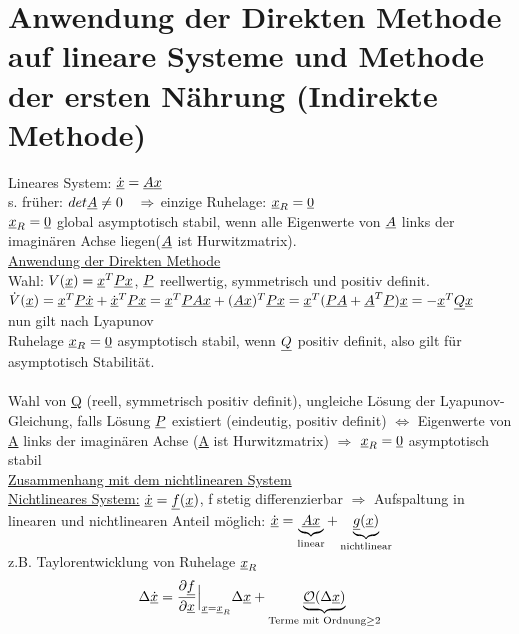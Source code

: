 \documentclass[openany,a4paper,11pt]{book}
\begin{document}
\section[Indirekte Methode]{Anwendung der Direkten Methode auf lineare Systeme und Methode der ersten Nährung (Indirekte Methode)}
Lineares System: $\dot{\uline{x}}=\uline{A}\uline{x}$\\
s. früher: $det\uline{A}\ne 0 \quad \Rightarrow$ einzige Ruhelage: $\uline{x}_R=\uline{0}$\\
$\uline{x}_R=\uline{0}$ global asymptotisch stabil, wenn alle Eigenwerte von $\uline{A}$ links der imaginären Achse liegen($\uline{A}$ ist Hurwitzmatrix).\\
\uline{Anwendung der Direkten Methode}\\
Wahl: $V(\uline{x})=\uline{x}^T\uline{P}\uline{x}$, $\uline{P}$ reellwertig, symmetrisch und positiv definit.\\
$\dot{V}(\uline{x})=\uline{x}^T\uline{P}\uline{\dot{x}}+\dot{\uline{x}}^T\uline{P}\uline{x}=\uline{x}^T\uline{P}\uline{A}\uline{x}+(\uline{A}\uline{x})^T\uline{P}\uline{x}=\uline{x}^T(\uline{P}\uline{A}+\uline{A}^T\uline{P})\uline{x}=-\uline{x}^T\uline{Q}\uline{x}$\\
nun gilt nach Lyapunov\\
Ruhelage $\uline{x}_R=\uline{0}$ asymptotisch stabil, wenn $\uline{Q}$ positiv definit, also gilt für asymptotisch Stabilität.\\
\\
Wahl von \uline{Q} (reell, symmetrisch positiv definit), ungleiche Lösung der Lyapunov-Gleichung, falls Lösung $\uline{P}$ existiert (eindeutig, positiv definit) $\Leftrightarrow$ Eigenwerte von \uline{A} links der imaginären Achse (\uline{A} ist Hurwitzmatrix) $\Rightarrow$ $\uline{x}_R=\uline{0}$ asymptotisch stabil\\
\uline{Zusammenhang mit dem nichtlinearen System}\\
\uline{Nichtlineares System:} $\uline{\dot{x}}=\uline{f}(\uline{x})$, f stetig differenzierbar $\Rightarrow$ Aufspaltung in linearen und nichtlinearen Anteil möglich: $\dot{\uline{x}}=\underbrace{\uline{A}\uline{x}}_{\text{linear}}+\underbrace{\uline{g}(\uline{x})}_{\text{nichtlinear}}$\\
z.B. Taylorentwicklung von Ruhelage $\uline{x}_R$
\[\Delta\uline{\dot{x}}=\frac{\partial \uline{f}}{\partial \uline{x}}\Big|_{\uline{x}=\uline{x}_R} \Delta\uline{x}+\underbrace{\uline{\mathcal{O}}(\Delta \uline{x})}_{\text{Terme mit Ordnung} \ge 2}\]
\end{document}
